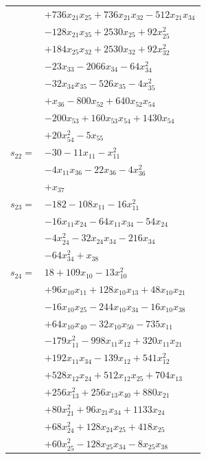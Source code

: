 \begin{longtable}{@{}r@{\;}l@{}}
 & \(\displaystyle +736x_{21}x_{25} +736x_{21}x_{32} -512x_{21}x_{34}\) \\
 & \(\displaystyle -128x_{21}x_{35} +2530x_{25} +92x_{25}^{2}\) \\
 & \(\displaystyle +184x_{25}x_{32} +2530x_{32} +92x_{32}^{2}\) \\
 & \(\displaystyle -23x_{33} -2066x_{34} -64x_{34}^{2}\) \\
 & \(\displaystyle -32x_{34}x_{35} -526x_{35} -4x_{35}^{2}\) \\
 & \(\displaystyle +x_{36} -800x_{52} +640x_{52}x_{54}\) \\
 & \(\displaystyle -200x_{53} +160x_{53}x_{54} +1430x_{54}\) \\
 & \(\displaystyle +20x_{54}^{2} -5x_{55}\) \\[3pt]
\(s_{22}=\) & \(\displaystyle -30 -11x_{11} -x_{11}^{2}\) \\
 & \(\displaystyle -4x_{11}x_{36} -22x_{36} -4x_{36}^{2}\) \\
 & \(\displaystyle +x_{37}\) \\[3pt]
\(s_{23}=\) & \(\displaystyle -182 -108x_{11} -16x_{11}^{2}\) \\
 & \(\displaystyle -16x_{11}x_{24} -64x_{11}x_{34} -54x_{24}\) \\
 & \(\displaystyle -4x_{24}^{2} -32x_{24}x_{34} -216x_{34}\) \\
 & \(\displaystyle -64x_{34}^{2} +x_{38}\) \\[3pt]
\(s_{24}=\) & \(\displaystyle 18 +109x_{10} -13x_{10}^{2}\) \\
 & \(\displaystyle +96x_{10}x_{11} +128x_{10}x_{13} +48x_{10}x_{21}\) \\
 & \(\displaystyle -16x_{10}x_{25} -244x_{10}x_{34} -16x_{10}x_{38}\) \\
 & \(\displaystyle +64x_{10}x_{40} -32x_{10}x_{50} -735x_{11}\) \\
 & \(\displaystyle -179x_{11}^{2} -998x_{11}x_{12} +320x_{11}x_{21}\) \\
 & \(\displaystyle +192x_{11}x_{34} -139x_{12} +541x_{12}^{2}\) \\
 & \(\displaystyle +528x_{12}x_{24} +512x_{12}x_{25} +704x_{13}\) \\
 & \(\displaystyle +256x_{13}^{2} +256x_{13}x_{40} +880x_{21}\) \\
 & \(\displaystyle +80x_{21}^{2} +96x_{21}x_{34} +1133x_{24}\) \\
 & \(\displaystyle +68x_{24}^{2} +128x_{24}x_{25} +418x_{25}\) \\
 & \(\displaystyle +60x_{25}^{2} -128x_{25}x_{34} -8x_{25}x_{38}\) \\

\end{longtable}
